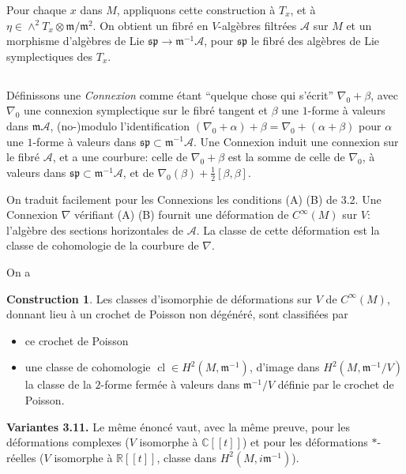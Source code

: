 \documentclass[11pt,a4paper]{article}
\theoremstyle{plain}
\theoremstyle{definition}
\newtheorem{construction}[theorem]{Construction}
\DeclareMathOperator{\cl}{cl}
\newcommand{\R}{\mathbb{R}}
\newcommand{\C}{\mathbb{C}}
\begin{document}
Pour chaque $x$ dans $M$, appliquons cette construction \`a $T_{x}$, et \`a $\eta \in \wedge^{2} T_{x} \otimes \mathfrak{m}/\mathfrak{m}^{2}$. On obtient un fibr\'e en $V$-alg\`ebres filtr\'ees $\mathcal{A}$ sur $M$ et un morphisme d'alg\`ebres de Lie $\mathfrak{sp} \to \mathfrak{m}^{-1}\mathcal{A}$, pour $\mathfrak{sp}$ le fibr\'e des alg\`ebres de Lie symplectiques des $T_{x}$.

\subsection{}
D\'efinissons une \emph{Connexion} comme \'etant ``quelque chose qui s'\'ecrit'' $\nabla_{0} + \beta$,
avec $\nabla_{0}$ une connexion symplectique sur le fibr\'e tangent et $\beta$ une $1$-forme \`a valeurs dans $\mathfrak{m}\mathcal{A}$, (no-)modulo l'identification $(\nabla_{0} + \alpha) + \beta = \nabla_{0} + (\alpha + \beta)$ pour $\alpha$ une $1$-forme \`a valeurs dans $\mathfrak{sp} \subset \mathfrak{m}^{-1}\mathcal{A}$. Une Connexion induit une connexion sur le fibr\'e $\mathcal{A}$, et a une courbure: celle de $\nabla_{0} + \beta$ est la somme de celle de $\nabla_{0}$, \`a valeurs dans $\mathfrak{sp} \subset \mathfrak{m}^{-1}\mathcal{A}$, et de $\nabla_{0}(\beta) + \frac{1}{2}[\beta,\beta]$.

On traduit facilement pour les Connexions les conditions (A) (B) de 3.2. Une Connexion $\nabla$ v\'erifiant (A) (B) fournit une d\'eformation de $C^{\infty}(M)$ sur $V$: l'alg\`ebre des sections horizontales de $\mathcal{A}$. La classe de cette d\'eformation est la classe de cohomologie de la courbure de $\nabla$.

On a

\begin{construction}
Les classes d'isomorphie de d\'eformations sur $V$ de $C^{\infty}(M)$,
donnant lieu \`a un crochet de Poisson non d\'eg\'en\'er\'e, sont classifi\'ees par
\begin{itemize}
\item[(a)] ce crochet de Poisson
\item[(b)] une classe de cohomologie $\cl \in H^{2}(M, \mathfrak{m}^{-1})$, d'image dans $H^{2}(M, \mathfrak{m}^{-1}/V)$ la classe de la $2$-forme ferm\'ee \`a valeurs dans $\mathfrak{m}^{-1}/V$ d\'efinie par le crochet de Poisson.
\end{itemize}
\end{construction}

\noindent \textbf{Variantes 3.11.} Le m\^eme \'enonc\'e vaut, avec la m\^eme preuve, pour les d\'eformations complexes ($V$ isomorphe \`a $\C[[t]]$) et pour les d\'eformations $*$-r\'eelles ($V$ isomorphe \`a $\R[[t]]$, classe dans $H^{2}(M, i\mathfrak{m}^{-1})$).
\end{document}
